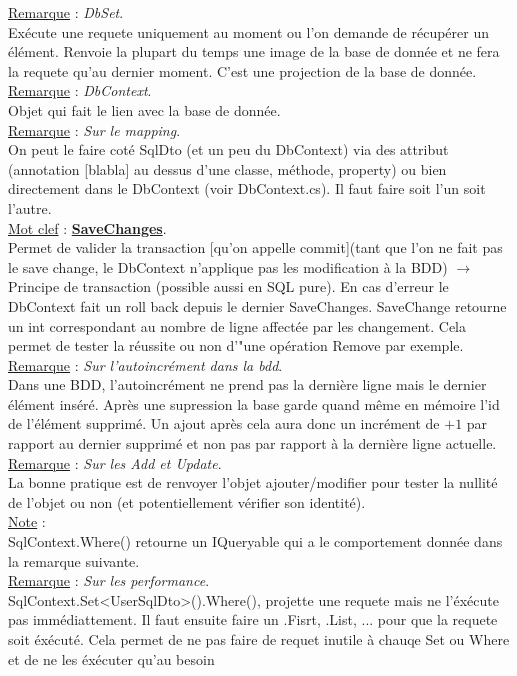 \documentclass[a4paper,12pt,twoside]{article}
\newcommand{\urlcolor}{magenta}  %
\newcommand{\keycolor}{purple} %
\newcommand{\incode}[1]{{\footnotesize\ttfamily #1}} %
\newcommand{\rem}[2]{\noindent\underline{Remarque} : \textit{#1}.\\ \indent #2}
\newcommand{\note}[1]{\noindent\underline{Note} : \\ \indent #1}
\newcommand{\keyref}[2]{\hypersetup{urlcolor=\keycolor} \href{#1}{\textbf{#2}}\hypersetup{urlcolor=\urlcolor}}
\newcommand{\keyword}[3]{\noindent\underline{Mot clef} : \keyref{#1}{#2}. \\ \indent #3}
\begin{document}
\rem{DbSet}{Exécute une requete uniquement au moment ou l'on demande de récupérer un élément. Renvoie la plupart du temps une image de la base de donnée et ne fera la requete qu'au dernier moment. C'est une projection de la base de donnée.}\\

\rem{DbContext}{Objet qui fait le lien avec la base de donnée.}\\

\rem{Sur le mapping}{On peut le faire coté SqlDto (et un peu du DbContext) via des attribut (annotation [blabla] au dessus d'une classe, méthode, property) ou bien directement dans le DbContext (voir DbContext.cs). Il faut faire soit l'un soit l'autre.}\\

\keyword{https://docs.microsoft.com/fr-fr/dotnet/api/system.data.entity.dbcontext.savechanges?view=entity-framework-6.2.0}{SaveChanges}{Permet de valider la transaction [qu'on appelle commit](tant que l'on ne fait pas le save change, le DbContext n'applique pas les modification à la BDD) $\to$ Principe de transaction (possible aussi en SQL pure). En cas d'erreur le DbContext fait un roll back depuis le dernier \incode{SaveChanges}. \incode{SaveChange} retourne un int correspondant au nombre de ligne affectée par les changement. Cela permet de tester la réussite ou non d'"une opération \incode{Remove} par exemple.}\\

\rem{Sur l'autoincrément dans la bdd}{Dans une BDD, l'autoincrément ne prend pas la dernière ligne mais le dernier élément inséré. Après une supression la base garde quand même en mémoire l'id de l'élément supprimé. Un ajout après cela aura donc un incrément de $+1$ par rapport au dernier supprimé et non pas par rapport à la dernière ligne actuelle.}\\

\rem{Sur les Add et Update}{La bonne pratique est de renvoyer l'objet ajouter/modifier pour tester la nullité de l'objet ou non (et potentiellement vérifier son identité).}\\

\note{SqlContext.Where() retourne un IQueryable qui a le comportement donnée dans la remarque suivante.}\\

\rem{Sur les performance}{SqlContext.Set<UserSqlDto>().Where(), projette une requete mais ne l'éxécute pas immédiattement. Il faut ensuite faire un .Fisrt, .List, ... pour que la requete soit éxécuté. Cela permet de ne pas faire de requet inutile à chauqe Set ou Where et de ne les éxécuter qu'au besoin}\\
\end{document}
